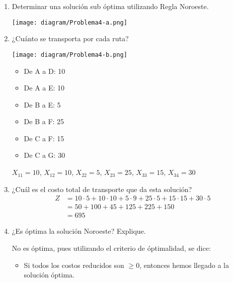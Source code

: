 \documentclass{templateNote}
\begin{document}
\begin{enumerate}
    \renewcommand{\labelenumi}{\alph{enumi})}
    \item Determinar una soluci\'on sub \'optima utilizando Regla Noroeste.
    \begin{center}
        \texttt{[image: diagram/Problema4-a.png]}
    \end{center}

    \item ¿Cu\'anto se transporta por cada ruta?
    
    \begin{minipage}{0.6\textwidth}
        \begin{flushleft}
            \texttt{[image: diagram/Problema4-b.png]}
        \end{flushleft}
    \end{minipage}
    \hfill
    \begin{minipage}{0.3\textwidth}
        \begin{itemize}
            \item De A a D: 10
            \item De A a E: 10
            \item De B a E: 5
            \item De B a F: 25
            \item De C a F: 15
            \item De C a G: 30
        \end{itemize}
    \end{minipage}

    $X_{11}=10$, $X_{12}=10$, $X_{22}=5$, $X_{23}=25$, $X_{33}=15$, $X_{34}=30$
    \item ¿Cu\'al es el costo total de transporte que da esta soluci\'on?
    \begin{align*}
        Z &= 10 \cdot 5 + 10 \cdot 10 + 5 \cdot 9 + 25 \cdot 5 + 15 \cdot 15 + 30 \cdot 5 \\
        &= 50 + 100 + 45 + 125 + 225 + 150 \\
        &= 695
    \end{align*}
    
    \newpage
    \item ¿Es \'optima la soluci\'on Noroeste? Explique.
    
    No es \'optima, pues utilizando el criterio de \'optimalidad, se dice:
    
    \begin{itemize}
        \item Si todos los costos reducidos son $\geq 0$, entonces hemos llegado a la soluci\'on \'optima.
    \end{itemize}


\end{enumerate}
\end{document}
